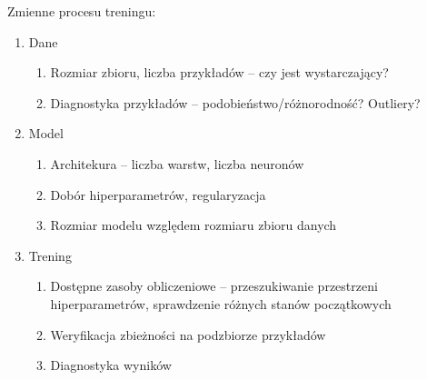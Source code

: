\documentclass[11pt, xcolor={dvipsnames,svgnames},aspectratio=169]{beamer}
\theoremstyle{plain}
\begin{document}
\begin{frame}
	Zmienne procesu treningu:
	\begin{enumerate}
		\item Dane
			\begin{enumerate}
				\item Rozmiar zbioru, liczba przykładów -- czy jest wystarczający?
				\item Diagnostyka przykładów -- podobieństwo/różnorodność? Outliery?
			\end{enumerate}
		\item Model
			\begin{enumerate}
				\item Architekura -- liczba warstw, liczba neuronów
				\item Dobór hiperparametrów, regularyzacja
				\item Rozmiar modelu względem rozmiaru zbioru danych
			\end{enumerate}			
		\item Trening
			\begin{enumerate}
				\item Dostępne zasoby obliczeniowe -- przeszukiwanie przestrzeni hiperparametrów, sprawdzenie różnych stanów początkowych
				\item Weryfikacja zbieżności na podzbiorze przykładów 
				\item Diagnostyka wyników
			\end{enumerate}
	\end{enumerate}
\end{frame}
\end{document}
